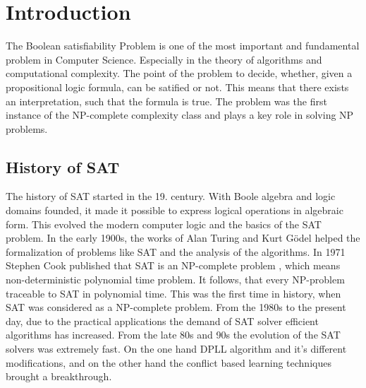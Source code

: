\documentclass{article}
\begin{document}
\vspace*{\fill}

\newpage







\section{Introduction}
The Boolean satisfiability Problem is one of the most important and fundamental problem in Computer Science. Especially in the theory of algorithms and computational complexity. The point of the problem to decide, whether, given a propositional logic formula, can be satified or not. This means that there exists an interpretation, such that the formula is true. The problem was the first instance of the NP-complete complexity class and plays a key role in solving NP problems.

\subsection{History of SAT}
The history of SAT started in the 19. century. With Boole algebra and logic domains founded, it made it possible to express logical operations in algebraic form. This evolved the modern computer logic and the basics of the SAT problem. In the early 1900s, the works of Alan Turing \cite{turing} and Kurt Gödel helped the formalization of problems like SAT and the analysis of the algorithms. In 1971 Stephen Cook published that SAT is an NP-complete problem \cite{satIsNPComplete}, which means non-deterministic polynomial time problem. It follows, that every NP-problem traceable to SAT in polynomial time. This was the first time in history, when SAT was considered as a NP-complete problem. From the 1980s to the present day, due to the practical applications the demand of SAT solver efficient algorithms has increased. From the late 80s and 90s the evolution of the SAT solvers was extremely fast. On the one hand DPLL algorithm \cite{dpll} and it's different modifications, and on the other hand the conflict based learning techniques brought a breakthrough.
\end{document}
